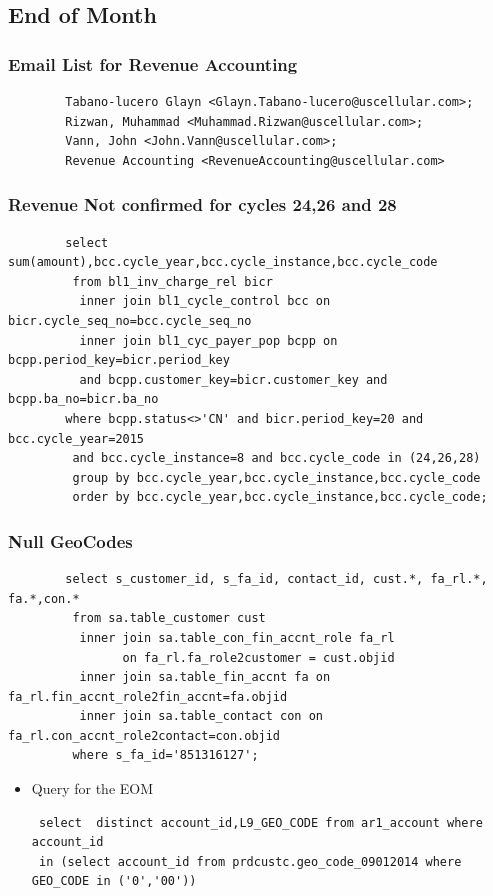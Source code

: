 \documentclass[12pt,twoside]{article}
\begin{document}
\subsection{End of Month}
\label{sec-11-3}
\subsubsection{Email List for Revenue Accounting}
\label{sec-11-3-1}

\begin{verbatim}
        Tabano-lucero Glayn <Glayn.Tabano-lucero@uscellular.com>; 
        Rizwan, Muhammad <Muhammad.Rizwan@uscellular.com>; 
        Vann, John <John.Vann@uscellular.com>;
        Revenue Accounting <RevenueAccounting@uscellular.com>
\end{verbatim}
\subsubsection{Revenue Not confirmed for cycles 24,26 and 28}
\label{sec-11-3-2}

\begin{verbatim}
        select sum(amount),bcc.cycle_year,bcc.cycle_instance,bcc.cycle_code
         from bl1_inv_charge_rel bicr 
          inner join bl1_cycle_control bcc on bicr.cycle_seq_no=bcc.cycle_seq_no 
          inner join bl1_cyc_payer_pop bcpp on bcpp.period_key=bicr.period_key 
          and bcpp.customer_key=bicr.customer_key and bcpp.ba_no=bicr.ba_no
        where bcpp.status<>'CN' and bicr.period_key=20 and bcc.cycle_year=2015 
         and bcc.cycle_instance=8 and bcc.cycle_code in (24,26,28)
         group by bcc.cycle_year,bcc.cycle_instance,bcc.cycle_code
         order by bcc.cycle_year,bcc.cycle_instance,bcc.cycle_code;
\end{verbatim}
\subsubsection{Null GeoCodes}
\label{sec-11-3-3}

\begin{verbatim}
        select s_customer_id, s_fa_id, contact_id, cust.*, fa_rl.*, fa.*,con.*
         from sa.table_customer cust
          inner join sa.table_con_fin_accnt_role fa_rl 
                on fa_rl.fa_role2customer = cust.objid
          inner join sa.table_fin_accnt fa on fa_rl.fin_accnt_role2fin_accnt=fa.objid
          inner join sa.table_contact con on fa_rl.con_accnt_role2contact=con.objid
         where s_fa_id='851316127';
\end{verbatim}
\begin{itemize}

\item Query for the EOM
\label{sec-11-3-3-1}%
\begin{verbatim}
 select  distinct account_id,L9_GEO_CODE from ar1_account where account_id 
 in (select account_id from prdcustc.geo_code_09012014 where GEO_CODE in ('0','00'))
\end{verbatim}
\end{itemize} %
\end{document}
